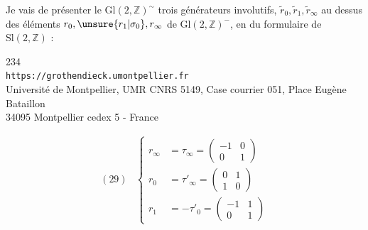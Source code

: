 Je vais  de présenter le  
$\mathrm{Gl}(2,\mathbb Z)^{\sim}$  trois générateurs involutifs,
 $\widetilde r_0,\widetilde r_1,\widetilde r_\infty$ au dessus des éléments
$r_0,\unsure{r_1|\sigma_0},r_\infty$ de $\mathrm{Gl}(2,\mathbb Z)^{-}$, en  du formulaire de $\mathrm{Sl}(2,\mathbb Z)$ :


\begin{center}
234\\
\texttt{https://grothendieck.umontpellier.fr}\\
Université de Montpellier, UMR CNRS 5149, Case courrier 051, Place Eugène Bataillon\\
34095 Montpellier cedex 5 - France
\end{center}

\[
\begin{array}{ll}
(29)&\left\{
\begin{aligned}
r_\infty&=\tau_\infty=\begin{pmatrix}-1&0\\0&1\end{pmatrix}\\
r_0&=\tau'_\infty=\begin{pmatrix}0&1\\1&0\end{pmatrix}\\
r_1&=-\tau'_0=\begin{pmatrix}-1&1\\0&1\end{pmatrix}
\end{aligned}
\right.
\end{array}
\]
\margin{$\left[\begin{array}{ll}
(30)&\left\{
\begin{aligned}
r_0(\rho)&=\rho^{-1},\quad r_0(\sigma)=\sigma^{-1}\\
r_1&=\rho^{-1}r_0=r_0\rho\\
r_\infty&=\sigma r_0=r_0\sigma^{-1}
\end{aligned}\right.
\end{array}\right.$}

